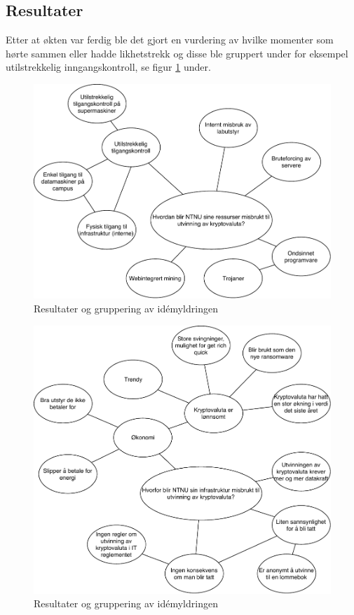 \subsection{Resultater}
Etter at økten var ferdig ble det gjort en vurdering av hvilke momenter som hørte sammen eller hadde likhetstrekk og disse ble gruppert under for eksempel utilstrekkelig inngangskontroll, se figur \ref{fig:idemyldring} under.




\begin{figure}[H]
    \centering
    \includegraphics[scale=0.5]{case_3/bilder/idemyldring-hvordan.pdf}
    \caption[Idémyldring]{Resultater og gruppering av idémyldringen}
     \label{fig:idemyldring}
\end{figure}

\begin{figure}[H]
    \centering
    \includegraphics[scale=0.5]{case_3/bilder/idemyldring-hvorfor.pdf}
    \caption[Idémyldring]{Resultater og gruppering av idémyldringen}
    \label{fig:idemyldring_2}
\end{figure}

